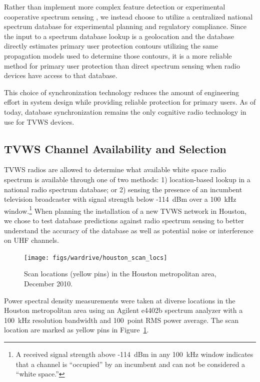 	Rather than implement more complex feature detection \cite{shellhammer2008spectrum} or experimental cooperative spectrum sensing \cite{mishra2006cooperative}, we instead choose to utilize a centralized national spectrum database for experimental planning and regulatory compliance.
	Since the input to a spectrum database lookup is a geolocation and the database directly estimates primary user protection contours utilizing the same propagation models used to determine those contours, it is a more reliable method for primary user protection than direct spectrum sensing when radio devices have access to that database.

	This choice of synchronization technology reduces the amount of engineering effort in system design while providing reliable protection for primary users.
	As of today, database synchronization remains the only cognitive radio technology in use for TVWS devices.

\subsection{TVWS Channel Availability and Selection}
\label{sec_tvws_chan_availability}

	\ac{TVWS} radios are allowed to determine what available white space radio spectrum is available through one of two methods: 1) location-based lookup in a national radio spectrum database; or 2) sensing the presence of an incumbent television broadcaster with signal strength below -114~dBm over a 100~kHz window.\footnote{A received signal strength above -114~dBm in any 100~kHz window indicates that a channel is ``occupied'' by an incumbent and can not be considered a ``white space.''}
	When planning the installation of a new \ac{TVWS} network in Houston, we chose to test database predictions against radio spectrum sensing to better understand the accuracy of the database as well as potential noise or interference on UHF channels.
	
\begin{figure}[ht]
\centering
  	\texttt{[image: figs/wardrive/houston\_scan\_locs]}   
   	\caption{Scan locations (yellow pins) in the Houston metropolitan area, December 2010.
	\label{fig_houston_scan_locs}}
\end{figure}

	Power spectral density measurements were taken at diverse locations in the Houston metropolitan area using an Agilent e4402b spectrum analyzer with a 100~kHz resolution bandwidth and 100~point \ac{RMS} power average.
	The scan location are marked as yellow pins in Figure~\ref{fig_houston_scan_locs}.
	
